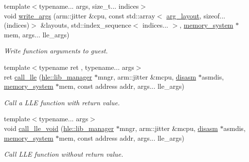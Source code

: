 \begin{DoxyCompactItemize}
\mbox{\label{namespaceeka2l1_1_1hle_ac61f147a648cc749728ffc4e25f6df26}} 
{\footnotesize template$<$typename... args, size\+\_\+t... indices$>$ }\\void \mbox{\hyperlink{namespaceeka2l1_1_1hle_ac61f147a648cc749728ffc4e25f6df26}{write\+\_\+args}} (arm\+::jitter \&cpu, const std\+::array$<$ \mbox{\hyperlink{structeka2l1_1_1hle_1_1arg__layout}{arg\+\_\+layout}}, sizeof...(indices)$>$ \&layouts, std\+::index\+\_\+sequence$<$ indices... $>$, \mbox{\hyperlink{classeka2l1_1_1memory__system}{memory\+\_\+system}} $\ast$mem, args... lle\+\_\+args)
\begin{DoxyCompactList}\small\item\em Write function arguments to guest. \end{DoxyCompactList}\item 
\mbox{\label{namespaceeka2l1_1_1hle_ae085df31d47d9c53907b6a7cf4cc2360}} 
{\footnotesize template$<$typename ret , typename... args$>$ }\\ret \mbox{\hyperlink{namespaceeka2l1_1_1hle_ae085df31d47d9c53907b6a7cf4cc2360}{call\+\_\+lle}} (\mbox{\hyperlink{classeka2l1_1_1hle_1_1lib__manager}{hle\+::lib\+\_\+manager}} $\ast$mngr, arm\+::jitter \&mcpu, \mbox{\hyperlink{classeka2l1_1_1disasm}{disasm}} $\ast$asmdis, \mbox{\hyperlink{classeka2l1_1_1memory__system}{memory\+\_\+system}} $\ast$mem, const address addr, args... lle\+\_\+args)
\begin{DoxyCompactList}\small\item\em Call a L\+LE function with return value. \end{DoxyCompactList}\item 
\mbox{\label{namespaceeka2l1_1_1hle_a922a3d814ecfe988bd58569c99a44cb3}} 
{\footnotesize template$<$typename... args$>$ }\\void \mbox{\hyperlink{namespaceeka2l1_1_1hle_a922a3d814ecfe988bd58569c99a44cb3}{call\+\_\+lle\+\_\+void}} (\mbox{\hyperlink{classeka2l1_1_1hle_1_1lib__manager}{hle\+::lib\+\_\+manager}} $\ast$mngr, arm\+::jitter \&mcpu, \mbox{\hyperlink{classeka2l1_1_1disasm}{disasm}} $\ast$asmdis, \mbox{\hyperlink{classeka2l1_1_1memory__system}{memory\+\_\+system}} $\ast$mem, const address addr, args... lle\+\_\+args)
\begin{DoxyCompactList}\small\item\em Call L\+LE function without return value. \end{DoxyCompactList}\item 

\end{DoxyCompactItemize}
